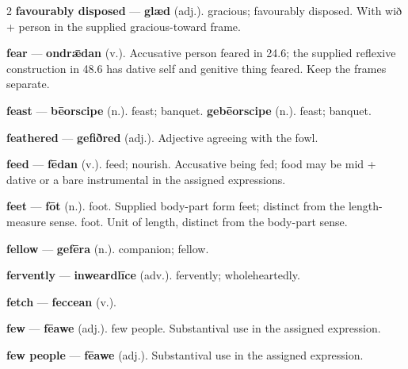 \begin{multicols}{2}
\textbf{favourably disposed} — \textbf{glæd} (adj.). gracious; favourably disposed. With wið + person in the supplied gracious-toward frame.\par
\textbf{fear} — \textbf{ondrǣdan} (v.). Accusative person feared in 24.6; the supplied reflexive construction in 48.6 has dative self and genitive thing feared. Keep the frames separate.\par
\textbf{feast} — \textbf{bēorscipe} (n.). feast; banquet. \textbf{gebēorscipe} (n.). feast; banquet.\par
\textbf{feathered} — \textbf{gefiðred} (adj.). Adjective agreeing with the fowl.\par
\textbf{feed} — \textbf{fēdan} (v.). feed; nourish. Accusative being fed; food may be mid + dative or a bare instrumental in the assigned expressions.\par
\textbf{feet} — \textbf{fōt} (n.). foot. Supplied body-part form feet; distinct from the length-measure sense. foot. Unit of length, distinct from the body-part sense.\par
\textbf{fellow} — \textbf{gefēra} (n.). companion; fellow.\par
\textbf{fervently} — \textbf{inweardlīce} (adv.). fervently; wholeheartedly.\par
\textbf{fetch} — \textbf{feccean} (v.).\par
\textbf{few} — \textbf{fēawe} (adj.). few people. Substantival use in the assigned expression.\par
\textbf{few people} — \textbf{fēawe} (adj.). Substantival use in the assigned expression.\par

\end{multicols}
